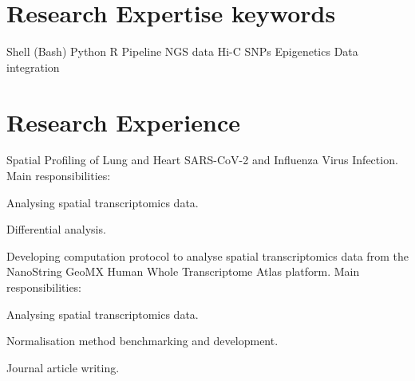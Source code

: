 \documentclass[]{deedy-resume-openfont}
\begin{document}
%
%
\lastupdated

%
%






\section{Research Expertise keywords}
\begin{flushleft}
Shell (Bash) \textbullet{} Python \textbullet{} R \textbullet{} Pipeline \textbullet{} NGS data \textbullet{} Hi-C \textbullet{} SNPs \textbullet{} Epigenetics \textbullet{} Data integration \\ 
\end{flushleft}

\section{Research Experience}

Spatial Profiling of Lung and Heart SARS-CoV-2 and Influenza Virus Infection.
Main responsibilities:
\begin{tightemize}
\item Analysing spatial transcriptomics data.
\item Differential analysis.
\end{tightemize}
\sectionsep

Developing computation protocol to analyse spatial transcriptomics data from the NanoString GeoMX Human Whole Transcriptome Atlas platform.
Main responsibilities:
\begin{tightemize}
\item Analysing spatial transcriptomics data.
\item Normalisation method benchmarking and development.
\item Journal article writing.
\end{tightemize}
\sectionsep
\end{document}
